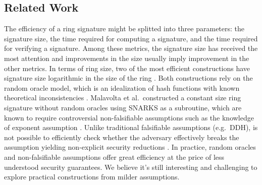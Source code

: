 \subsection{Related Work}
The efficiency of a ring signature might be splitted into three parameters: the signature size, the time required for computing a signature, and the time required for verifying a signature. Among these metrics, the signature size has received the most attention and improvements in the size usually imply improvement in the other metrics.
In terms of ring size, two of the most efficient constructions have signature size logarithmic in the size of the ring \cite{EC:GroKoh15,EC:LLNW16}. Both constructions rely on the {random oracle model}, which is an idealization of hash functions with known theoretical inconsistencies \cite{FOCS:GolKal03}. Malavolta et al.~constructed a constant size ring signature without random oracles \cite{AC:MalSch17} using SNARKS \cite{EC:GGPR13,AC:DFGK14,EC:Groth16} as a subroutine, which are known to require controversial non-falsifiable assumptions such as the knowledge of exponent assumption  \cite{STOC:GenWic11,C:Naor03}. Unlike traditional falsifiable assumptions (e.g.~DDH), is not possible to efficiently check whether the adversary effectively breaks the assumption yielding non-explicit security reductions \cite{C:Naor03}. In practice, random oracles and non-falsifiable assumptions offer great efficiency at the price of less understood security guarantees. We believe it's still interesting and challenging to explore practical constructions from milder assumptions.

